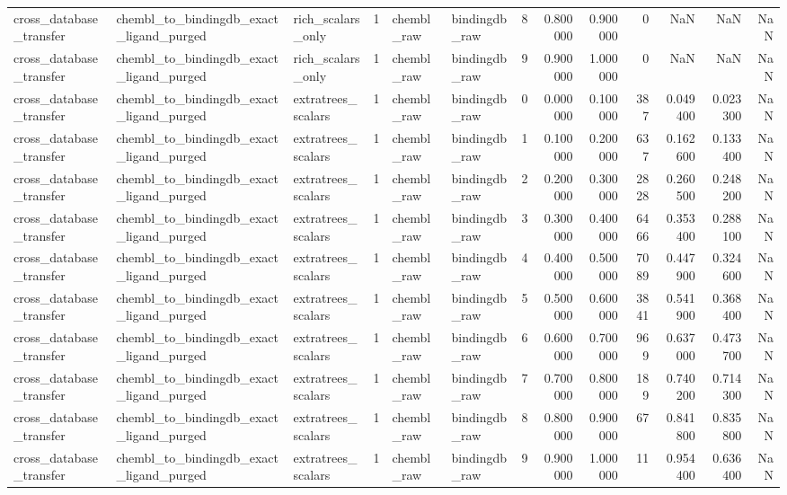 \begin{longtable}{lllrllrrrrrrr}
cross\_database\_transfer & chembl\_to\_bindingdb\_exact\_ligand\_purged & rich\_scalars\_only & 1 & chembl\_raw & bindingdb\_raw & 8 & 0.800000 & 0.900000 & 0 & NaN & NaN & NaN \\
cross\_database\_transfer & chembl\_to\_bindingdb\_exact\_ligand\_purged & rich\_scalars\_only & 1 & chembl\_raw & bindingdb\_raw & 9 & 0.900000 & 1.000000 & 0 & NaN & NaN & NaN \\
cross\_database\_transfer & chembl\_to\_bindingdb\_exact\_ligand\_purged & extratrees\_scalars & 1 & chembl\_raw & bindingdb\_raw & 0 & 0.000000 & 0.100000 & 387 & 0.049400 & 0.023300 & NaN \\
cross\_database\_transfer & chembl\_to\_bindingdb\_exact\_ligand\_purged & extratrees\_scalars & 1 & chembl\_raw & bindingdb\_raw & 1 & 0.100000 & 0.200000 & 637 & 0.162600 & 0.133400 & NaN \\
cross\_database\_transfer & chembl\_to\_bindingdb\_exact\_ligand\_purged & extratrees\_scalars & 1 & chembl\_raw & bindingdb\_raw & 2 & 0.200000 & 0.300000 & 2828 & 0.260500 & 0.248200 & NaN \\
cross\_database\_transfer & chembl\_to\_bindingdb\_exact\_ligand\_purged & extratrees\_scalars & 1 & chembl\_raw & bindingdb\_raw & 3 & 0.300000 & 0.400000 & 6466 & 0.353400 & 0.288100 & NaN \\
cross\_database\_transfer & chembl\_to\_bindingdb\_exact\_ligand\_purged & extratrees\_scalars & 1 & chembl\_raw & bindingdb\_raw & 4 & 0.400000 & 0.500000 & 7089 & 0.447900 & 0.324600 & NaN \\
cross\_database\_transfer & chembl\_to\_bindingdb\_exact\_ligand\_purged & extratrees\_scalars & 1 & chembl\_raw & bindingdb\_raw & 5 & 0.500000 & 0.600000 & 3841 & 0.541900 & 0.368400 & NaN \\
cross\_database\_transfer & chembl\_to\_bindingdb\_exact\_ligand\_purged & extratrees\_scalars & 1 & chembl\_raw & bindingdb\_raw & 6 & 0.600000 & 0.700000 & 969 & 0.637000 & 0.473700 & NaN \\
cross\_database\_transfer & chembl\_to\_bindingdb\_exact\_ligand\_purged & extratrees\_scalars & 1 & chembl\_raw & bindingdb\_raw & 7 & 0.700000 & 0.800000 & 189 & 0.740200 & 0.714300 & NaN \\
cross\_database\_transfer & chembl\_to\_bindingdb\_exact\_ligand\_purged & extratrees\_scalars & 1 & chembl\_raw & bindingdb\_raw & 8 & 0.800000 & 0.900000 & 67 & 0.841800 & 0.835800 & NaN \\
cross\_database\_transfer & chembl\_to\_bindingdb\_exact\_ligand\_purged & extratrees\_scalars & 1 & chembl\_raw & bindingdb\_raw & 9 & 0.900000 & 1.000000 & 11 & 0.954400 & 0.636400 & NaN \\

\end{longtable}
